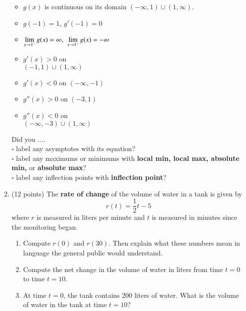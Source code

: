 \documentclass[12pt]{article}
\renewcommand{\emph}[1]{\textsf{\textbf{#1}}}
\begin{document}
\begin{enumerate}
\begin{minipage}{0.7\textwidth}
\end{minipage}
\hspace*{-.5in}
\begin{minipage}{0.3\textwidth}
	\begin{itemize}
\item $g(x)$ is continuous on its domain $(-\infty,1) \cup (1,\infty).$
\item $g(-1)=1$, $g'(-1)=0$
\item $\displaystyle \lim_{x \to 1^-} g(x)= \infty,\\ \: \lim_{x \to 1^+} g(x)= -\infty$
\item $g'(x)>0$ on\\ $(-1,1) \cup (1,\infty)$ 
\item $g'(x)<0$ on $(-\infty,-1)$
\item $g''(x)>0$ on $(-3,1)$ 
\item  $g''(x)<0$ on\\ $(-\infty,-3) \cup (1, \infty)$
	\end{itemize}
\end{minipage}
\vfill
Did you ....\\
$\square$ label any asymptotes with its equation?\\
$\square$ label any maximums or minimums with \emph{local min, local max, absolute min,} or \emph{absolute max}?\\
$\square$ label any inflection points with \emph{inflection point}?\\
\newpage
\item (12 points)  The \emph{rate of change} of the volume of water in a tank is given by 
$$r(t)=\frac{1}{2}t-5$$ where $r$ is measured in liters per minute and $t$ is measured in minutes since the monitoring began. 
	\begin{enumerate}
\item Compute $r(0)$ and $r(30)$. Then explain what these numbers mean in language the general public would understand. 
\vfill
\item Compute the net change in the volume of water in liters from time $t=0$ to time $t=10.$
\vfill
\item At time $t=0$, the tank contains 200 liters of water. What is the volume of water in the tank at time $t=10$?\vfill
	\end{enumerate}


\end{enumerate}
\end{document}
